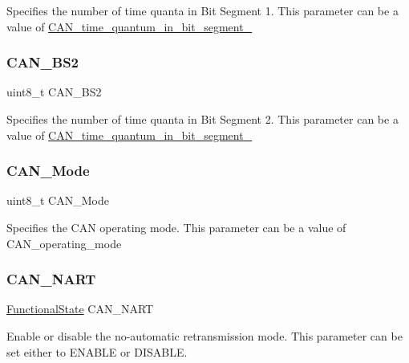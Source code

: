 Specifies the number of time quanta in Bit Segment 1. This parameter can be a value of \mbox{\hyperlink{group___c_a_n__time__quantum__in__bit__segment__1}{C\+A\+N\+\_\+time\+\_\+quantum\+\_\+in\+\_\+bit\+\_\+segment\+\_}} \mbox{\label{struct_c_a_n___init_type_def_a590ee9ab09e8c53d829444bdff407f1c}} 
\subsubsection{\texorpdfstring{CAN\_BS2}{CAN\_BS2}}
{\footnotesize\ttfamily uint8\+\_\+t C\+A\+N\+\_\+\+B\+S2}

Specifies the number of time quanta in Bit Segment 2. This parameter can be a value of \mbox{\hyperlink{group___c_a_n__time__quantum__in__bit__segment__2}{C\+A\+N\+\_\+time\+\_\+quantum\+\_\+in\+\_\+bit\+\_\+segment\+\_}} \mbox{\label{struct_c_a_n___init_type_def_ab06e41b2b56aa5aee6d27bdc07ca1bcf}} 
\subsubsection{\texorpdfstring{CAN\_Mode}{CAN\_Mode}}
{\footnotesize\ttfamily uint8\+\_\+t C\+A\+N\+\_\+\+Mode}

Specifies the C\+AN operating mode. This parameter can be a value of C\+A\+N\+\_\+operating\+\_\+mode \mbox{\label{struct_c_a_n___init_type_def_ad956a58de0401d8bdd582b5f92c6fa82}} 
\subsubsection{\texorpdfstring{CAN\_NART}{CAN\_NART}}
{\footnotesize\ttfamily \mbox{\hyperlink{group___exported__types_gac9a7e9a35d2513ec15c3b537aaa4fba1}{Functional\+State}} C\+A\+N\+\_\+\+N\+A\+RT}

Enable or disable the no-\/automatic retransmission mode. This parameter can be set either to E\+N\+A\+B\+LE or D\+I\+S\+A\+B\+LE. \mbox{\label{struct_c_a_n___init_type_def_abebaaf7d2ff24fcc501c5f39c00b8742}} 
